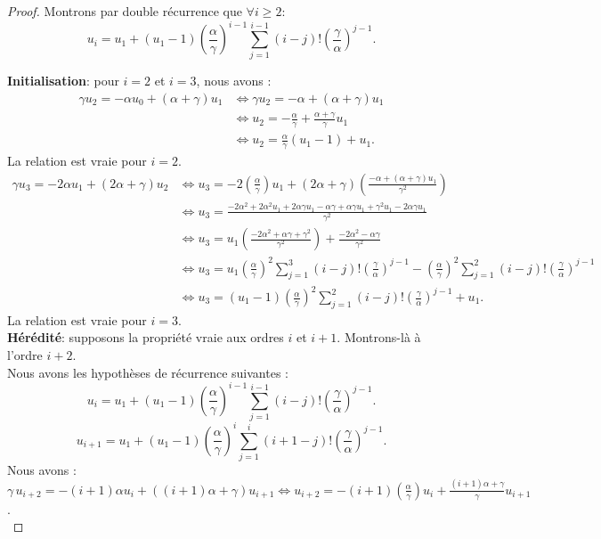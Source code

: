 \documentclass[12pt,a4paper]{report}
\theoremstyle{remark}
\begin{document}
\begin{proof}
Montrons par double récurrence que $\forall i \geqslant 2$:
$$u_i = u_1 + (u_1 - 1)\left(\frac{\alpha}{\gamma}\right)^{i-1} \sum_{j=1}^{i-1}(i-j)!\left(\frac{\gamma}{\alpha}\right)^{j-1}.$$

\textbf{Initialisation}: pour $i=2$ et $i=3$, nous avons :
\begin{align*}
\gamma u_2 = -\alpha u_0 + (\alpha + \gamma) u_1 &\iff \gamma u_2 = - \alpha + (\alpha + \gamma)u_1 \\
&\iff u_2 = - \frac{\alpha}{\gamma} + \frac{\alpha + \gamma}{\gamma} u_1 \\
&\iff u_2 = \frac{\alpha}{\gamma}(u_1 - 1) + u_1.
\end{align*}
La relation est vraie pour $i=2$.
\begin{align*}
\gamma u_3 = -2 \alpha u_1 + (2 \alpha + \gamma) u_2 &\iff u_3 = -2 \left(\frac{\alpha}{\gamma}\right) u_1 + (2 \alpha + \gamma)\left(\frac{-\alpha + (\alpha + \gamma) u_1}{\gamma^2}\right) \\
&\iff u_3 = \frac{-2 \alpha^2 + 2 \alpha^2 u_1 + 2 \alpha \gamma u_1 - \alpha \gamma + \alpha \gamma u_1 + \gamma^2 u_1 -2 \alpha \gamma u_1}{\gamma^2} \\
&\iff u_3 = u_1 \left(\frac{-2 \alpha^2 + \alpha \gamma + \gamma^2}{\gamma^2}\right) + \frac{-2 \alpha^2 - \alpha \gamma}{\gamma^2} \\
&\iff u_3 = u_1 \left(\frac{\alpha}{\gamma}\right)^{2} \sum_{j=1}^{3}(i-j)!\left(\frac{\gamma}{\alpha}\right)^{j-1} - \left(\frac{\alpha}{\gamma}\right)^{2} \sum_{j=1}^{2}(i-j)!\left(\frac{\gamma}{\alpha}\right)^{j-1} \\
&\iff u_3 = (u_1 - 1)\left(\frac{\alpha}{\gamma}\right)^{2} \sum_{j=1}^{2}(i-j)!\left(\frac{\gamma}{\alpha}\right)^{j-1} + u_1.
\end{align*}
La relation est vraie pour $i=3$.\\

\textbf{Hérédité}: supposons la propriété vraie aux ordres $i$ et $i+1$. Montrons-là à l'ordre $i+2$.\\

Nous avons les hypothèses de récurrence suivantes :
$$u_i = u_1 + (u_1 - 1)\left(\frac{\alpha}{\gamma}\right)^{i-1} \sum_{j=1}^{i-1}(i-j)!\left(\frac{\gamma}{\alpha}\right)^{j-1}.$$
$$u_{i+1} = u_1 + (u_1 - 1)\left(\frac{\alpha}{\gamma}\right)^{i} \sum_{j=1}^{i}(i+1-j)!\left(\frac{\gamma}{\alpha}\right)^{j-1}
.$$
Nous avons : $\gamma \, u_{i+2} = -(i+1) \alpha u_i + ((i+1) \alpha + \gamma) u_{i+1} \iff u_{i+2} = -(i+1) \left(\frac{\alpha}{\gamma}\right) u_i + \frac{(i+1) \alpha + \gamma}{\gamma} u_{i+1}$.
\\


\end{proof}
\end{document}
